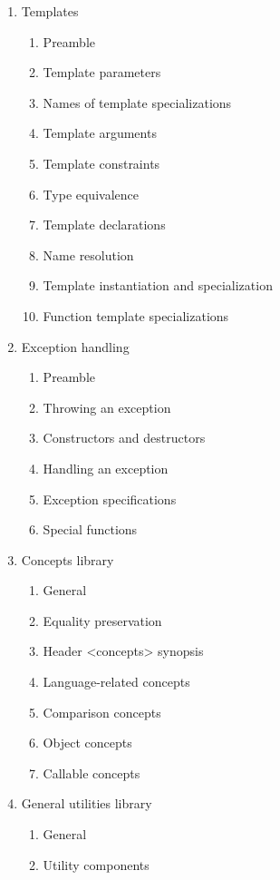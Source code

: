 \begin{enumerate}
\item Templates
    \begin{enumerate}[label=\arabic{enumi}.\arabic*.]
      \item Preamble 
      \item Template parameters 
      \item Names of template specializations 
      \item Template arguments 
      \item Template constraints 
      \item Type equivalence 
      \item Template declarations
      \item Name resolution 
      \item Template instantiation and specialization
      \item Function template specializations
    \end{enumerate}
\item Exception handling
    \begin{enumerate}[label=\arabic{enumi}.\arabic*.]
      \item Preamble 
      \item Throwing an exception 
      \item Constructors and destructors
      \item Handling an exception 
      \item Exception specifications 
      \item Special functions
     \end{enumerate}
\item Concepts library
    \begin{enumerate}[label=\arabic{enumi}.\arabic*.]
      \item General 
      \item Equality preservation 
      \item Header <concepts> synopsis 
      \item Language-related concepts 
      \item Comparison concepts 
      \item Object concepts 
      \item Callable concepts
     \end{enumerate}
\item General utilities library
    \begin{enumerate}[label=\arabic{enumi}.\arabic*.]
      \item General 
      \item Utility components 

\end{enumerate}
\end{enumerate}
